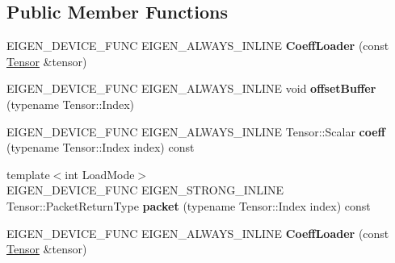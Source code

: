 \subsection*{Public Member Functions}
\begin{DoxyCompactItemize}
\item 
\mbox{\label{struct_eigen_1_1internal_1_1_coeff_loader_ae4e88ebc9e72b1c2408255ee927e6d9a}} 
E\+I\+G\+E\+N\+\_\+\+D\+E\+V\+I\+C\+E\+\_\+\+F\+U\+NC E\+I\+G\+E\+N\+\_\+\+A\+L\+W\+A\+Y\+S\+\_\+\+I\+N\+L\+I\+NE {\bfseries Coeff\+Loader} (const \hyperlink{class_eigen_1_1_tensor}{Tensor} \&tensor)
\item 
\mbox{\label{struct_eigen_1_1internal_1_1_coeff_loader_a7be29df470c90f7946ddfbf03bec79fb}} 
E\+I\+G\+E\+N\+\_\+\+D\+E\+V\+I\+C\+E\+\_\+\+F\+U\+NC E\+I\+G\+E\+N\+\_\+\+A\+L\+W\+A\+Y\+S\+\_\+\+I\+N\+L\+I\+NE void {\bfseries offset\+Buffer} (typename Tensor\+::\+Index)
\item 
\mbox{\label{struct_eigen_1_1internal_1_1_coeff_loader_ae63c80db8734f22daf0f01a9cffc2099}} 
E\+I\+G\+E\+N\+\_\+\+D\+E\+V\+I\+C\+E\+\_\+\+F\+U\+NC E\+I\+G\+E\+N\+\_\+\+A\+L\+W\+A\+Y\+S\+\_\+\+I\+N\+L\+I\+NE Tensor\+::\+Scalar {\bfseries coeff} (typename Tensor\+::\+Index index) const
\item 
\mbox{\label{struct_eigen_1_1internal_1_1_coeff_loader_ab5563f7024db6c443acc9ec4b19e5f52}} 
{\footnotesize template$<$int Load\+Mode$>$ }\\E\+I\+G\+E\+N\+\_\+\+D\+E\+V\+I\+C\+E\+\_\+\+F\+U\+NC E\+I\+G\+E\+N\+\_\+\+S\+T\+R\+O\+N\+G\+\_\+\+I\+N\+L\+I\+NE Tensor\+::\+Packet\+Return\+Type {\bfseries packet} (typename Tensor\+::\+Index index) const
\item 
\mbox{\label{struct_eigen_1_1internal_1_1_coeff_loader_ae4e88ebc9e72b1c2408255ee927e6d9a}} 
E\+I\+G\+E\+N\+\_\+\+D\+E\+V\+I\+C\+E\+\_\+\+F\+U\+NC E\+I\+G\+E\+N\+\_\+\+A\+L\+W\+A\+Y\+S\+\_\+\+I\+N\+L\+I\+NE {\bfseries Coeff\+Loader} (const \hyperlink{class_eigen_1_1_tensor}{Tensor} \&tensor)
\item 
\mbox{\label{struct_eigen_1_1internal_1_1_coeff_loader_a7be29df470c90f7946ddfbf03bec79fb}} 

\end{DoxyCompactItemize}
